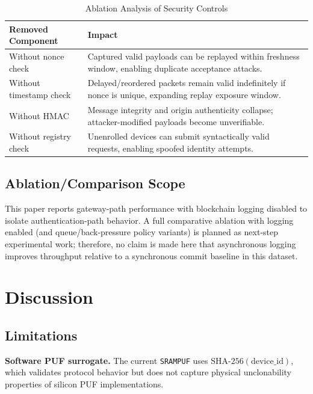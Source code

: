 \documentclass[conference]{IEEEtran}
\begin{document}
\begin{table}[!htbp]
\caption{Ablation Analysis of Security Controls}
\label{tab:ablation_security}
\centering
\setlength{\tabcolsep}{4pt}
\renewcommand{\arraystretch}{1.2}
\begin{tabularx}{\columnwidth}{@{}L{2.4cm}X@{}}
\toprule
\textbf{Removed Component} & \textbf{Impact} \\
\midrule
Without nonce check & Captured valid payloads can be replayed within freshness window, enabling duplicate acceptance attacks. \\
Without timestamp check & Delayed/reordered packets remain valid indefinitely if nonce is unique, expanding replay exposure window. \\
Without HMAC & Message integrity and origin authenticity collapse; attacker-modified payloads become unverifiable. \\
Without registry check & Unenrolled devices can submit syntactically valid requests, enabling spoofed identity attempts. \\
\bottomrule
\end{tabularx}
\end{table}

\subsection{Ablation/Comparison Scope}

This paper reports gateway-path performance with blockchain logging disabled to
isolate authentication-path behavior. A full comparative ablation with logging
enabled (and queue/back-pressure policy variants) is planned as next-step
experimental work; therefore, no claim is made here that asynchronous logging
improves throughput relative to a synchronous commit baseline in this dataset.

\section{Discussion}
\label{sec:discuss}

\subsection{Limitations}

\textbf{Software PUF surrogate.} The current \texttt{SRAMPUF} uses
$\text{SHA-256}(\text{device\_id})$, which validates protocol behavior but does
not capture physical unclonability properties of silicon PUF implementations.
\end{document}
